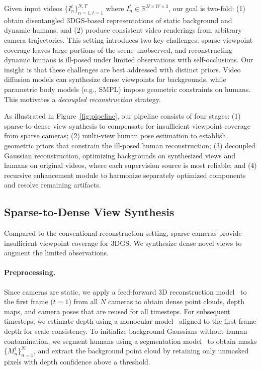 \documentclass[acmtog]{acmart}
\begin{document}
Given input videos $\{I_n^t\}_{n=1,t=1}^{N,T}$ where $I_n^t \in \mathbb{R}^{H \times W \times 3}$, our goal is two-fold:
(1) obtain disentangled 3DGS-based representations of static background and dynamic humans, and
(2) produce consistent video renderings from arbitrary camera trajectories.
This setting introduces two key challenges: sparse viewpoint coverage leaves large portions of the scene unobserved, and reconstructing dynamic humans is ill-posed under limited observations with self-occlusions.
Our insight is that these challenges are best addressed with distinct priors.
Video diffusion models can synthesize dense viewpoints for backgrounds, while parametric body models (e.g., SMPL) impose geometric constraints on humans.
This motivates a \emph{decoupled reconstruction} strategy.

As illustrated in Figure~\ref{fig:pipeline}, our pipeline consists of four stages:
(1) sparse-to-dense view synthesis to compensate for insufficient viewpoint coverage from sparse cameras;
(2) multi-view human pose estimation to establish geometric priors that constrain the ill-posed human reconstruction;
(3) decoupled Gaussian reconstruction, optimizing backgrounds on synthesized views and humans on original videos, where each supervision source is most reliable; and
(4) recursive enhancement module to harmonize separately optimized components and resolve remaining artifacts.
\subsection{Sparse-to-Dense View Synthesis}
\label{sec:view_synthesis}

Compared to the conventional reconstruction setting, sparse cameras provide insufficient viewpoint coverage for 3DGS.
We synthesize dense novel views to augment the limited observations.

\paragraph{Preprocessing.}
Since cameras are static, we apply a feed-forward 3D reconstruction model~\cite{wang2025pi} to the first frame ($t=1$) from all $N$ cameras to obtain dense point clouds, depth maps, and camera poses that are reused for all timesteps.
For subsequent timesteps, we estimate depth using a monocular model~\cite{wang2025moge} aligned to the first-frame depth for scale consistency.
To initialize background Gaussians without human contamination, we segment humans using a segmentation model~\cite{carion2025sam} to obtain masks $\{M_n^1\}_{n=1}^{N}$, and extract the background point cloud by retaining only unmasked pixels with depth confidence above a threshold.
\end{document}
